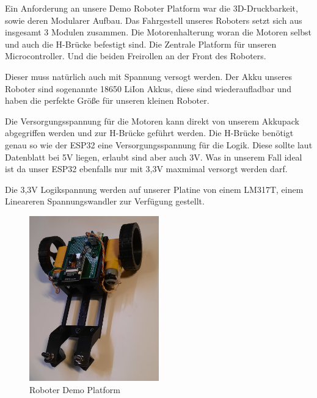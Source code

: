 \begin{flushleft}
    Ein Anforderung an unsere Demo Roboter Platform war die 3D-Druckbarkeit, sowie deren Modularer Aufbau.
    Das Fahrgestell unseres Roboters setzt sich aus insgesamt 3 Modulen zusammen.
    Die Motorenhalterung woran die Motoren selbst und auch die H-Brücke befestigt sind.
    Die Zentrale Platform für unseren Microcontroller.
    Und die beiden Freirollen an der Front des Roboters.

    Dieser muss natürlich auch mit Spannung versogt werden.
    Der Akku unseres Roboter sind sogenannte 18650 LiIon Akkus, diese sind wiederaufladbar und haben die perfekte Größe 
    für unseren kleinen Roboter.

    Die Versorgungsspannung für die Motoren kann direkt von unserem Akkupack abgegriffen werden und zur H-Brücke geführt werden.
    Die H-Brücke benötigt genau so wie der ESP32 eine Versorgungsspannung für die Logik.
    Diese sollte laut Datenblatt bei 5V liegen, erlaubt sind aber auch 3V. Was in unserem Fall ideal ist da unser ESP32
    ebenfalls nur mit 3,3V maxmimal versorgt werden darf.

    Die 3,3V Logikspannung werden auf unserer Platine von einem LM317T, einem Lineareren Spannungswandler zur Verfügung gestellt.

    \begin{figure}[h!]
        \centering
        \includegraphics[width=0.5\textwidth]{imgs/Roboter/Real/Roboter.jpg}
        \caption{Roboter Demo Platform}
      \end{figure}

\end{flushleft}